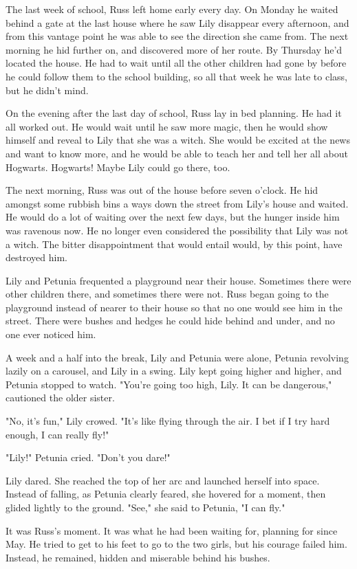 \documentclass[a4paper,11pt]{article}
\begin{document}
The last week of school, Russ left home early every day. On Monday he waited behind a gate at the last house where he saw Lily disappear every afternoon, and from this vantage point he was able to see the direction she came from. The next morning he hid further on, and discovered more of her route. By Thursday he'd located the house. He had to wait until all the other children had gone by before he could follow them to the school building, so all that week he was late to class, but he didn't mind.

On the evening after the last day of school, Russ lay in bed planning. He had it all worked out. He would wait until he saw more magic, then he would show himself and reveal to Lily that she was a witch. She would be excited at the news and want to know more, and he would be able to teach her and tell her all about Hogwarts. Hogwarts! Maybe Lily could go there, too.

The next morning, Russ was out of the house before seven o'clock. He hid amongst some rubbish bins a ways down the street from Lily's house and waited. He would do a lot of waiting over the next few days, but the hunger inside him was ravenous now. He no longer even considered the possibility that Lily was not a witch. The bitter disappointment that would entail would, by this point, have destroyed him.

Lily and Petunia frequented a playground near their house. Sometimes there were other children there, and sometimes there were not. Russ began going to the playground instead of nearer to their house so that no one would see him in the street. There were bushes and hedges he could hide behind and under, and no one ever noticed him.

A week and a half into the break, Lily and Petunia were alone, Petunia revolving lazily on a carousel, and Lily in a swing. Lily kept going higher and higher, and Petunia stopped to watch. "You're going too high, Lily. It can be dangerous," cautioned the older sister.

"No, it's fun," Lily crowed. "It's like flying through the air. I bet if I try hard enough, I can really fly!"

"Lily!" Petunia cried. "Don't you dare!"

Lily dared. She reached the top of her arc and launched herself into space. Instead of falling, as Petunia clearly feared, she hovered for a moment, then glided lightly to the ground. "See," she said to Petunia, "I can fly."

It was Russ's moment. It was what he had been waiting for, planning for since May. He tried to get to his feet to go to the two girls, but his courage failed him. Instead, he remained, hidden and miserable behind his bushes.
\end{document}
